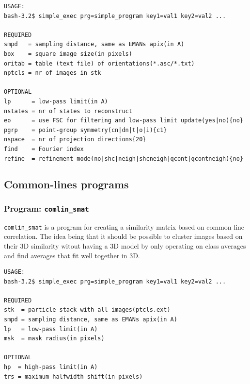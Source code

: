 \documentclass[a4paper,11pt]{article}
\newcommand{\prgname}[1]{\textcolor{NavyBlue}{\texttt{#1}}}
\begin{document}
\begin{verbatim}
USAGE:
bash-3.2$ simple_exec prg=simple_program key1=val1 key2=val2 ...

REQUIRED
smpd   = sampling distance, same as EMANs apix(in A)
box    = square image size(in pixels)
oritab = table (text file) of orientations(*.asc/*.txt)
nptcls = nr of images in stk

OPTIONAL
lp      = low-pass limit(in A)
nstates = nr of states to reconstruct
eo      = use FSC for filtering and low-pass limit update(yes|no){no}
pgrp    = point-group symmetry(cn|dn|t|o|i){c1}
nspace  = nr of projection directions{20}
find    = Fourier index
refine  = refinement mode(no|shc|neigh|shcneigh|qcont|qcontneigh){no}
\end{verbatim}

\subsection{Common-lines programs}

\subsubsection{Program: \prgname{comlin\_smat}}
\label{comlin_smat}
\prgname{comlin\_smat} is a program for creating a similarity matrix based on common line correlation. The idea being that it should be possible to cluster images based on their 3D similarity witout having a 3D model by only operating on class averages and find averages that fit well together in 3D.

\begin{verbatim}
USAGE:
bash-3.2$ simple_exec prg=simple_program key1=val1 key2=val2 ...

REQUIRED
stk  = particle stack with all images(ptcls.ext)
smpd = sampling distance, same as EMANs apix(in A)
lp   = low-pass limit(in A)
msk  = mask radius(in pixels)

OPTIONAL
hp  = high-pass limit(in A)
trs = maximum halfwidth shift(in pixels)
\end{verbatim}
\end{document}
